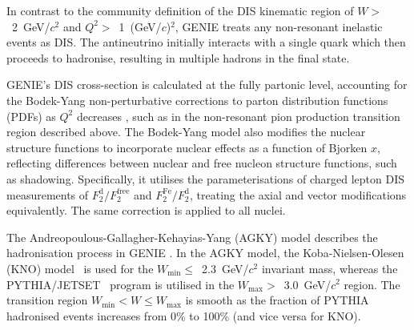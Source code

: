 
In contrast to the community definition of the DIS kinematic region of \mbox{$W >$ 2 GeV/$c^2$} and \mbox{$Q^2 >$ 1 (GeV/$c$)$^2$}, GENIE treats any non-resonant inelastic events as DIS. The antineutrino initially interacts with a single quark which then proceeds to hadronise, resulting in multiple hadrons in the final state. 

GENIE's DIS cross-section is calculated at the fully partonic level, accounting for the Bodek-Yang non-perturbative corrections to parton distribution functions (PDFs) as $Q^2$ decreases \cite{BodekYang_2003, BODEK2005113}, such as in the non-resonant pion production transition region described above. The Bodek-Yang model \cite{BodekYang_2003, BODEK2005113} also modifies the nuclear structure functions to incorporate nuclear effects as a function of Bjorken $x$, reflecting differences between nuclear and free nucleon structure functions, such as shadowing. Specifically, it utilises the parameterisations of charged lepton DIS measurements of $F_2^{\text{d}}/F_2^{\text{free}}$ and $F_2^{\text{Fe}}/F_2^{\text{d}}$, treating the axial and vector modifications equivalently. The same correction is applied to all nuclei.


The Andreopoulous-Gallagher-Kehayias-Yang (AGKY) model describes the hadronisation process in GENIE \cite{AGKY_Yang_2009}. In the AGKY model, the Koba-Nielsen-Olesen (KNO) model~\cite{KNO_KOBA1972317} is used for the \mbox{$W_{\text{min}} \leq $ 2.3 GeV/$c^2$} invariant mass, whereas the PYTHIA/JET\-SET~\cite{Pythia_Sjostrand_2001} program is utilised in the \mbox{$W_{\text{max}} > $ 3.0 GeV/$c^2$} region. The transition region $W_{\text{min}} < W \leq W_{\text{max}}$ is smooth as the fraction of PYTHIA hadronised events increases from 0\% to 100\% (and vice versa for KNO).

